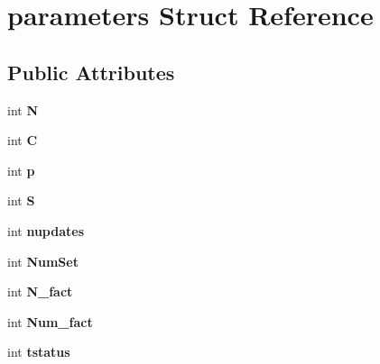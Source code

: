 \hypertarget{structparameters}{}\section{parameters Struct Reference}
\label{structparameters}
\subsection*{Public Attributes}
\begin{DoxyCompactItemize}
\item 
int {\bfseries N}\hypertarget{structparameters_a0b2132a2da84d48e4575f6d9e8e899ee}{}\label{structparameters_a0b2132a2da84d48e4575f6d9e8e899ee}

\item 
int {\bfseries C}\hypertarget{structparameters_a2143fd1bb0b1132240b2ac1f48797837}{}\label{structparameters_a2143fd1bb0b1132240b2ac1f48797837}

\item 
int {\bfseries p}\hypertarget{structparameters_a83fbd6f42d209aab6d3aa8360835cb55}{}\label{structparameters_a83fbd6f42d209aab6d3aa8360835cb55}

\item 
int {\bfseries S}\hypertarget{structparameters_a491bc36fe07cd5249f7d54fd82f7cb63}{}\label{structparameters_a491bc36fe07cd5249f7d54fd82f7cb63}

\item 
int {\bfseries nupdates}\hypertarget{structparameters_adaa744c06c33db9f1116ddd62bf97303}{}\label{structparameters_adaa744c06c33db9f1116ddd62bf97303}

\item 
int {\bfseries Num\+Set}\hypertarget{structparameters_a7308970e43d375353d1fccc1e581a8f4}{}\label{structparameters_a7308970e43d375353d1fccc1e581a8f4}

\item 
int {\bfseries N\+\_\+fact}\hypertarget{structparameters_a3fd36b05da1943711146096ac4528c92}{}\label{structparameters_a3fd36b05da1943711146096ac4528c92}

\item 
int {\bfseries Num\+\_\+fact}\hypertarget{structparameters_a9d567a9e2b598ee9fbe8ac4ecd611bb4}{}\label{structparameters_a9d567a9e2b598ee9fbe8ac4ecd611bb4}

\item 
int {\bfseries tstatus}\hypertarget{structparameters_ab1a47a209b6cbeea981c2001aa48a603}{}\label{structparameters_ab1a47a209b6cbeea981c2001aa48a603}


\end{DoxyCompactItemize}
